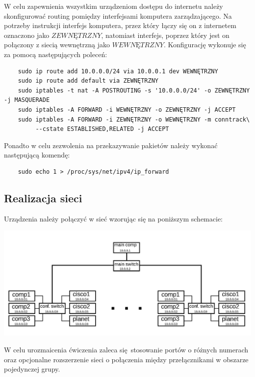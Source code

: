 \documentclass[polish,envcountsect,10pt]{article}
\begin{document}
W celu zapewnienia wszystkim urządzeniom dostępu do internetu należy skonfigurować routing pomiędzy interfejsami komputera zarządzającego. Na potrzeby instrukcji interfejs komputera, przez który łączy się on z internetem oznaczono jako $ZEWNĘTRZNY$, natomiast interfejs, poprzez który jest on połączony z siecią wewnętrzną jako $WEWNĘTRZNY$. Konfigurację wykonuje się za pomocą następujących poleceń:
\begin{verbatim}
	sudo ip route add 10.0.0.0/24 via 10.0.0.1 dev WEWNĘTRZNY
	sudo ip route add default via ZEWNĘTRZNY
	sudo iptables -t nat -A POSTROUTING -s '10.0.0.0/24' -o ZEWNĘTRZNY -j MASQUERADE
	sudo iptables -A FORWARD -i WEWNĘTRZNY -o ZEWNĘTRZNY -j ACCEPT
	sudo iptables -A FORWARD -i ZEWNĘTRZNY -o WEWNĘTRZNY -m conntrack\
	     --cstate ESTABLISHED,RELATED -j ACCEPT
\end{verbatim}
Ponadto w celu zezwolenia na przekazywanie pakietów należy wykonać następującą komendę:
\begin{verbatim}
	sudo echo 1 > /proc/sys/net/ipv4/ip_forward
\end{verbatim}

\subsection{Realizacja sieci}

Urządzenia należy połączyć w sieć wzorując się na poniższym schemacie:

\includegraphics[width=\linewidth]{siec.png}

W celu urozmaicenia ćwiczenia zaleca się stosowanie portów o różnych numerach oraz opcjonalne rozszerzenie sieci o połączenia między przełącznikami w obszarze pojedynczej grupy.
\end{document}

